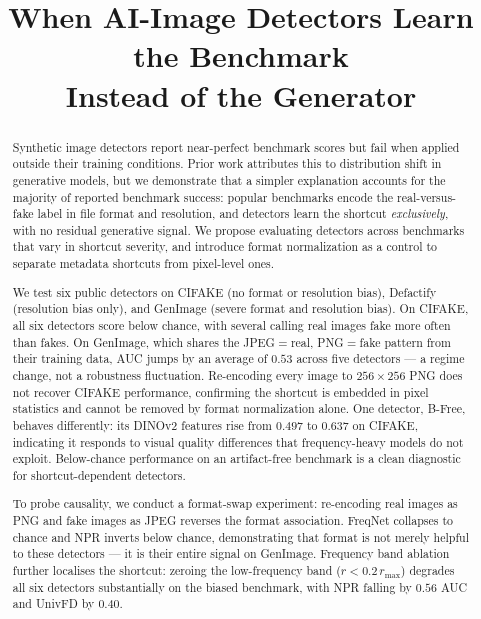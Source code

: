 \documentclass{bmvc2k}
\title{When AI-Image Detectors Learn the Benchmark\\ Instead of the Generator}
\begin{document}
\maketitle

\begin{abstract}
Synthetic image detectors report near-perfect benchmark scores but fail when applied outside their training conditions. Prior work attributes this to distribution shift in generative models, but we demonstrate that a simpler explanation accounts for the majority of reported benchmark success: popular benchmarks encode the real-versus-fake label in file format and resolution, and detectors learn the shortcut \emph{exclusively}, with no residual generative signal. We propose evaluating detectors across benchmarks that vary in shortcut severity, and introduce format normalization as a control to separate metadata shortcuts from pixel-level ones.

We test six public detectors on CIFAKE (no format or resolution bias), Defactify (resolution bias only), and GenImage (severe format and resolution bias). On CIFAKE, all six detectors score below chance, with several calling real images fake more often than fakes. On GenImage, which shares the JPEG$=$real, PNG$=$fake pattern from their training data, AUC jumps by an average of $0.53$ across five detectors --- a regime change, not a robustness fluctuation. Re-encoding every image to $256\times256$ PNG does not recover CIFAKE performance, confirming the shortcut is embedded in pixel statistics and cannot be removed by format normalization alone. One detector, B-Free, behaves differently: its DINOv2 features rise from $0.497$ to $0.637$ on CIFAKE, indicating it responds to visual quality differences that frequency-heavy models do not exploit. Below-chance performance on an artifact-free benchmark is a clean diagnostic for shortcut-dependent detectors.

To probe causality, we conduct a format-swap experiment: re-encoding real images as PNG and fake images as JPEG reverses the format association. FreqNet collapses to chance and NPR inverts below chance, demonstrating that format is not merely helpful to these detectors --- it is their entire signal on GenImage. Frequency band ablation further localises the shortcut: zeroing the low-frequency band ($r < 0.2\,r_{\max}$) degrades all six detectors substantially on the biased benchmark, with NPR falling by $0.56$ AUC and UnivFD by $0.40$.
\end{abstract}
\end{document}
